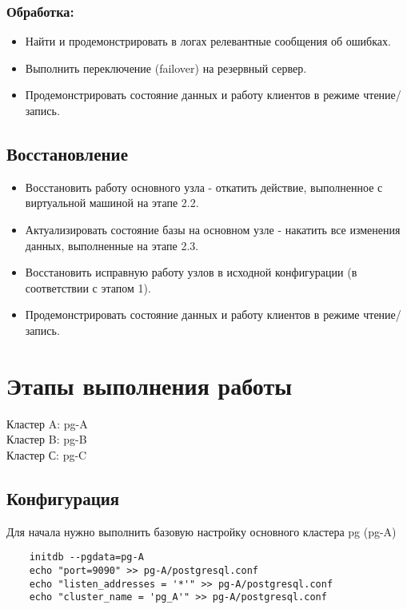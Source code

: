 \documentclass{article}
\begin{document}
        \subsubsection{Обработка:}
            \begin{itemize}
                \item Найти и продемонстрировать в логах релевантные сообщения об ошибках.
                \item Выполнить переключение (failover) на резервный сервер.
                \item Продемонстрировать состояние данных и работу клиентов в режиме чтение/запись.
            \end{itemize}
    
    \subsection{Восстановление}
        \begin{itemize}
            \item Восстановить работу основного узла - откатить действие, выполненное с виртуальной машиной на этапе 2.2.
            \item Актуализировать состояние базы на основном узле - накатить все изменения данных, выполненные на этапе 2.3.
            \item Восстановить исправную работу узлов в исходной конфигурации (в соответствии с этапом 1).
            \item Продемонстрировать состояние данных и работу клиентов в режиме чтение/запись.
        \end{itemize}
        
\section{Этапы выполнения работы}
    Кластер A: pg-A \\
    Кластер B: pg-B \\
    Кластер С: pg-C

\subsection{Конфигурация}
Для начала нужно выполнить базовую настройку основного кластера pg (pg-A)
\begin{verbatim}
    initdb --pgdata=pg-A
    echo "port=9090" >> pg-A/postgresql.conf
    echo "listen_addresses = '*'" >> pg-A/postgresql.conf
    echo "cluster_name = 'pg_A'" >> pg-A/postgresql.conf
\end{verbatim}
\end{document}
